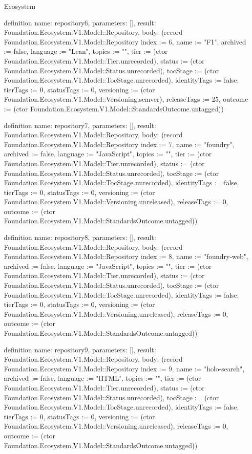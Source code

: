 \begin{lexlean}{Ecosystem}
\begin{semanticmodule}
definition{
  name: repository6,
  parameters: [],
  result: Foundation.Ecosystem.V1.Model::Repository,
  body: (record Foundation.Ecosystem.V1.Model::Repository {index := 6, name := "F1", archived := false, language := "Lean", topics := "", tier := (ctor Foundation.Ecosystem.V1.Model::Tier.unrecorded), status := (ctor Foundation.Ecosystem.V1.Model::Status.unrecorded), tocStage := (ctor Foundation.Ecosystem.V1.Model::TocStage.unrecorded), identityTags := false, tierTags := 0, statusTags := 0, versioning := (ctor Foundation.Ecosystem.V1.Model::Versioning.semver), releaseTags := 25, outcome := (ctor Foundation.Ecosystem.V1.Model::StandardsOutcome.untagged)})
}

definition{
  name: repository7,
  parameters: [],
  result: Foundation.Ecosystem.V1.Model::Repository,
  body: (record Foundation.Ecosystem.V1.Model::Repository {index := 7, name := "foundry", archived := false, language := "JavaScript", topics := "", tier := (ctor Foundation.Ecosystem.V1.Model::Tier.unrecorded), status := (ctor Foundation.Ecosystem.V1.Model::Status.unrecorded), tocStage := (ctor Foundation.Ecosystem.V1.Model::TocStage.unrecorded), identityTags := false, tierTags := 0, statusTags := 0, versioning := (ctor Foundation.Ecosystem.V1.Model::Versioning.unreleased), releaseTags := 0, outcome := (ctor Foundation.Ecosystem.V1.Model::StandardsOutcome.untagged)})
}

definition{
  name: repository8,
  parameters: [],
  result: Foundation.Ecosystem.V1.Model::Repository,
  body: (record Foundation.Ecosystem.V1.Model::Repository {index := 8, name := "foundry-web", archived := false, language := "JavaScript", topics := "", tier := (ctor Foundation.Ecosystem.V1.Model::Tier.unrecorded), status := (ctor Foundation.Ecosystem.V1.Model::Status.unrecorded), tocStage := (ctor Foundation.Ecosystem.V1.Model::TocStage.unrecorded), identityTags := false, tierTags := 0, statusTags := 0, versioning := (ctor Foundation.Ecosystem.V1.Model::Versioning.unreleased), releaseTags := 0, outcome := (ctor Foundation.Ecosystem.V1.Model::StandardsOutcome.untagged)})
}

definition{
  name: repository9,
  parameters: [],
  result: Foundation.Ecosystem.V1.Model::Repository,
  body: (record Foundation.Ecosystem.V1.Model::Repository {index := 9, name := "holo-search", archived := false, language := "HTML", topics := "", tier := (ctor Foundation.Ecosystem.V1.Model::Tier.unrecorded), status := (ctor Foundation.Ecosystem.V1.Model::Status.unrecorded), tocStage := (ctor Foundation.Ecosystem.V1.Model::TocStage.unrecorded), identityTags := false, tierTags := 0, statusTags := 0, versioning := (ctor Foundation.Ecosystem.V1.Model::Versioning.unreleased), releaseTags := 0, outcome := (ctor Foundation.Ecosystem.V1.Model::StandardsOutcome.untagged)})
}


\end{semanticmodule}
\end{lexlean}
